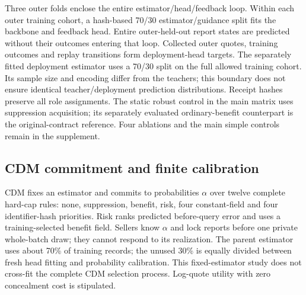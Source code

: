 \documentclass[pdflatex,sn-nature]{sn-jnl}
\begin{document}
Three outer folds enclose the entire estimator/head/feedback loop. Within
each outer training cohort, a hash-based 70/30 estimator/guidance split
fits the backbone and feedback head. Entire outer-held-out report states
are predicted without their outcomes entering that loop. Collected outer
quotes, training outcomes and replay transitions form deployment-head targets.
The separately fitted deployment estimator uses a 70/30 split on the full
allowed training cohort. Its sample size and encoding differ from the
teachers; this boundary does not ensure identical teacher/deployment
prediction distributions. Receipt hashes preserve all role assignments.
The static robust control in the main matrix uses suppression acquisition;
its separately evaluated ordinary-benefit counterpart is the original-contract
reference. Four ablations and the main simple controls remain in the supplement.

\subsection{CDM commitment and finite calibration}
\label{sec:cdm_commitment}
CDM fixes an estimator and commits to probabilities $\alpha$ over twelve
complete hard-cap rules: none, suppression, benefit, risk, four constant-field
and four identifier-hash priorities. Risk ranks predicted before-query error
and uses a training-selected benefit field. Sellers know $\alpha$ and lock
reports before one private whole-batch draw; they cannot respond to its
realization. The parent estimator uses about 70\% of training records; the
unused 30\% is equally divided between fresh head fitting and probability
calibration. This fixed-estimator study does not cross-fit the complete CDM
selection process. Log-quote utility with zero concealment cost is stipulated.
\end{document}
